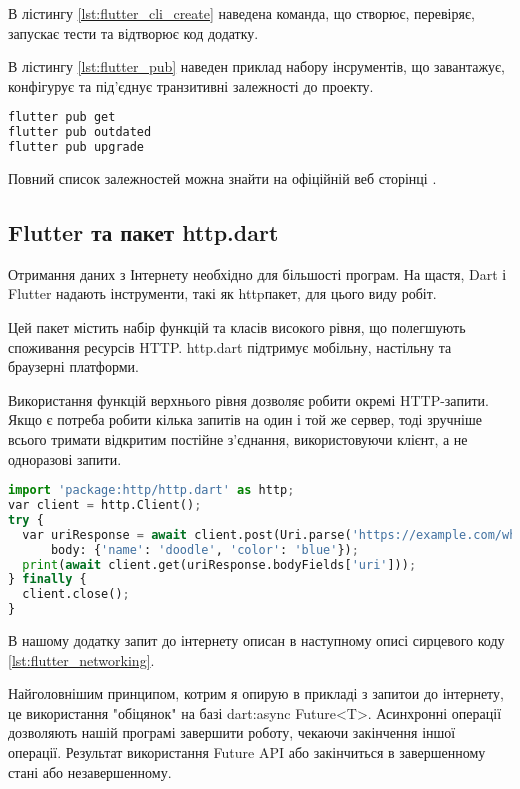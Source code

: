 В лістингу \ref{lst:flutter_cli_create} наведена команда, що створює, перевіряє, запускає тести та відтворює код додатку.

В лістингу \ref{lst:flutter_pub} наведен приклад набору інсрументів,
що завантажує, конфігурує та під'єднує транзитивні залежності до проекту.

\begin{lstlisting}[style=light, language=Python,label={lst:flutter_pub},caption=Flutter Dependency Resolution]
flutter pub get
flutter pub outdated
flutter pub upgrade
\end{lstlisting}

Повний список залежностей можна знайти на офіційній веб сторінці \cite{flutter_cli}.

\subsection{Flutter та пакет http.dart}
\label{subsec:flutter_http_dart_theory}
Отримання даних з Інтернету необхідно для більшості програм.
На щастя, Dart і Flutter надають інструменти, такі як httpпакет, для цього виду робіт.

Цей пакет містить набір функцій та класів високого рівня, що полегшують споживання ресурсів HTTP.
http.dart підтримує мобільну, настільну та браузерні платформи.

Використання функцій верхнього рівня дозволяє робити окремі HTTP-запити.
Якщо є потреба робити кілька запитів на один і той же сервер, тоді зручніше всього тримати відкритим постійне з’єднання,
використовуючи клієнт, а не одноразові запити.

\begin{lstlisting}[style=light, language=Python,label={lst:flutter_pub},caption=Flutter Dependency Resolution]
import 'package:http/http.dart' as http;
var client = http.Client();
try {
  var uriResponse = await client.post(Uri.parse('https://example.com/whatsit/create'),
      body: {'name': 'doodle', 'color': 'blue'});
  print(await client.get(uriResponse.bodyFields['uri']));
} finally {
  client.close();
}
\end{lstlisting}

В нашому додатку запит до інтернету описан в наступному описі сирцевого коду \ref{lst:flutter_networking}.

Найголовнішим принципом, котрим я опирую в прикладі з запитои до інтернету, це використання "обіцянок" на базі dart:async Future<T>.
Асинхронні операції дозволяють нашій програмі завершити роботу, чекаючи закінчення іншої операції.
Результат використання Future API або закінчиться в завершенному стані або незавершенному.

